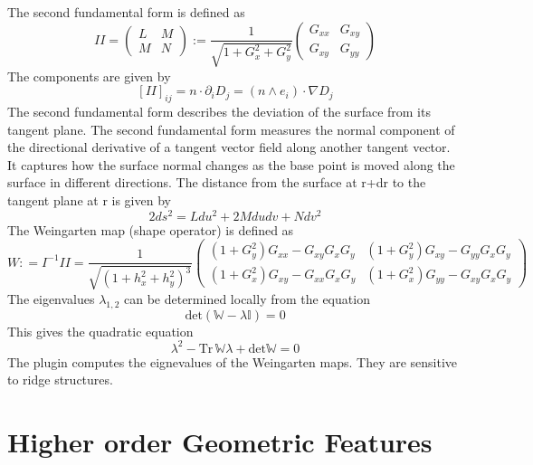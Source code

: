 \documentclass{amsart}
\begin{document}
The second fundamental form is defined as
\[
II = \begin{pmatrix}
	L & M \\
	M & N
\end{pmatrix} :=
\frac{1}{\sqrt{1 +G_x^2 + G_y^2}}
\begin{pmatrix}
	 G_{xx}  &  G_{xy} \\
	 G_{xy}  &  G_{yy} 
\end{pmatrix}
\]
The components are given by
\[
[II]_{ij} = n \cdot  \partial_{i} D_j  = (n \wedge e_i) \cdot \nabla D_j
\]
The second fundamental form describes the deviation of the surface
from its tangent plane.
The second fundamental form measures the normal component of the directional derivative of a tangent vector field along another tangent vector.
It captures how the surface normal changes as the base point is moved along the surface in different directions.
The distance from the surface at r+dr to the tangent plane at r is given by
\[
2 ds^2 = L du^2 + 2 M du dv + N dv^2
\]
The Weingarten map (shape operator) is defined as
\[
W: = I^{-1} II = \frac{1}{\sqrt{\left( 1 +h_x^2 + h_y^2 \right)^3 }} 
\begin{pmatrix}
	(1+ G_{y}^2) G_{xx} - G_{xy} G_x G_y &  (1+ G_{y}^2) G_{xy} - G_{yy} G_x G_y  \\
	(1+ G_{x}^2) G_{xy} - G_{xx} G_x G_y  & (1+ G_{x}^2) G_{yy} - G_{xy} G_x G_y
\end{pmatrix}
\]
The eigenvalues $\lambda_{1,2}$ can be determined locally from the equation 
\[
\mathrm{det} (\mathbb{W} - \lambda \mathbb{I} )= 0
\]
This gives the quadratic equation
\[
\lambda^2 - \mathrm{Tr} \,\mathbb{W}  \lambda + 	\mathrm{det} \mathbb{W} =  0
\]
The plugin computes the eignevalues of the Weingarten maps.
They are sensitive to ridge structures.

\section{Higher order Geometric Features}\label{sec:nroder}

\end{document}
